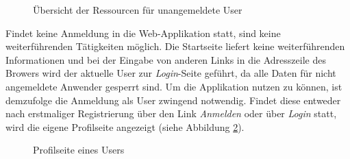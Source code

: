 \documentclass[a4paper,12pt,parskip,bibtotoc,liststotoc]{article}
\begin{document}
\begin{figure}[h!]
  \begin{center}
    \caption{Übersicht der Ressourcen für unangemeldete User}  \label{reres}
  \end{center}
\end{figure}

Findet keine Anmeldung in die Web-Applikation statt, sind keine weiterführenden Tätigkeiten möglich. Die Startseite liefert keine weiterführenden Informationen und bei der Eingabe von anderen Links in die Adresszeile des Browers wird der aktuelle User zur \textit{Login}-Seite geführt, da alle Daten für nicht angemeldete Anwender gesperrt sind. %
Um die Applikation nutzen zu können, ist demzufolge die Anmeldung als User zwingend notwendig. Findet diese entweder nach erstmaliger Registrierung über den Link \textit{Anmelden} oder über \textit{Login} statt, wird die eigene Profilseite angezeigt (siehe Abbildung \ref{Profil}).\\

\begin{figure}[h!]
  \begin{center}
    \caption{Profilseite eines Users}  \label{Profil}
  \end{center}
\end{figure}
\end{document}
